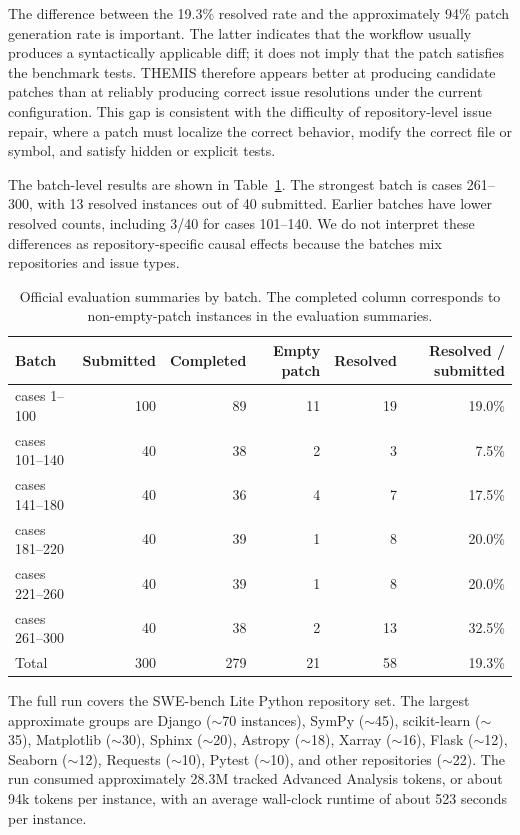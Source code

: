 \documentclass[11pt]{article}
\begin{document}
The difference between the 19.3\% resolved rate and the approximately 94\% patch generation rate is important.  The latter indicates that the workflow usually produces a syntactically applicable diff; it does not imply that the patch satisfies the benchmark tests.  THEMIS therefore appears better at producing candidate patches than at reliably producing correct issue resolutions under the current configuration.  This gap is consistent with the difficulty of repository-level issue repair, where a patch must localize the correct behavior, modify the correct file or symbol, and satisfy hidden or explicit tests.

The batch-level results are shown in Table~\ref{tab:batch-results}.  The strongest batch is cases 261--300, with 13 resolved instances out of 40 submitted.  Earlier batches have lower resolved counts, including 3/40 for cases 101--140.  We do not interpret these differences as repository-specific causal effects because the batches mix repositories and issue types.

\begin{table}[t]
\centering
\small
\begin{tabular}{lrrrrr}
\toprule
Batch & Submitted & Completed & Empty patch & Resolved & Resolved / submitted \\
\midrule
cases 1--100 & 100 & 89 & 11 & 19 & 19.0\% \\
cases 101--140 & 40 & 38 & 2 & 3 & 7.5\% \\
cases 141--180 & 40 & 36 & 4 & 7 & 17.5\% \\
cases 181--220 & 40 & 39 & 1 & 8 & 20.0\% \\
cases 221--260 & 40 & 39 & 1 & 8 & 20.0\% \\
cases 261--300 & 40 & 38 & 2 & 13 & 32.5\% \\
\midrule
Total & 300 & 279 & 21 & 58 & 19.3\% \\
\bottomrule
\end{tabular}
\caption{Official evaluation summaries by batch.  The completed column corresponds to non-empty-patch instances in the evaluation summaries.}
\label{tab:batch-results}
\end{table}

The full run covers the SWE-bench Lite Python repository set.  The largest approximate groups are Django ($\sim$70 instances), SymPy ($\sim$45), scikit-learn ($\sim$35), Matplotlib ($\sim$30), Sphinx ($\sim$20), Astropy ($\sim$18), Xarray ($\sim$16), Flask ($\sim$12), Seaborn ($\sim$12), Requests ($\sim$10), Pytest ($\sim$10), and other repositories ($\sim$22).  The run consumed approximately 28.3M tracked Advanced Analysis tokens, or about 94k tokens per instance, with an average wall-clock runtime of about 523 seconds per instance.
\end{document}
